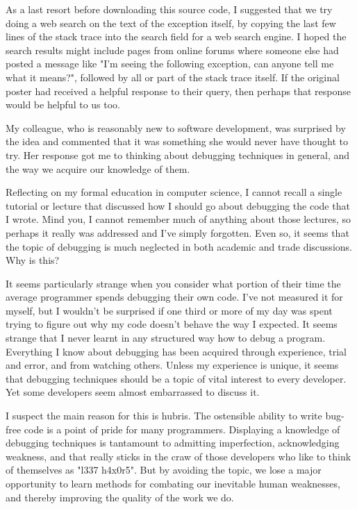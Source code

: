 \documentclass{article}
\begin{document}
As a last resort before downloading this source code, I suggested that
we try doing a web search on the text of the exception itself, by
copying the last few lines of the stack trace into the search field for
a web search engine. I hoped the search results might include pages from
online forums where someone else had posted a message like "I'm seeing
the following exception, can anyone tell me what it means?", followed by
all or part of the stack trace itself. If the original poster had
received a helpful response to their query, then perhaps that response
would be helpful to us too.

My colleague, who is reasonably new to software development, was
surprised by the idea and commented that it was something she would
never have thought to try. Her response got me to thinking about
debugging techniques in general, and the way we acquire our knowledge of
them.

Reflecting on my formal education in computer science, I cannot recall a
single tutorial or lecture that discussed how I should go about
debugging the code that I wrote. Mind you, I cannot remember much of
anything about those lectures, so perhaps it really was addressed and
I've simply forgotten. Even so, it seems that the topic of debugging is
much neglected in both academic and trade discussions. Why is this?

It seems particularly strange when you consider what portion of their
time the average programmer spends debugging their own code. I've not
measured it for myself, but I wouldn't be surprised if one third or more
of my day was spent trying to figure out why my code doesn't behave the
way I expected. It seems strange that I never learnt in any structured
way how to debug a program. Everything I know about debugging has been
acquired through experience, trial and error, and from watching others.
Unless my experience is unique, it seems that debugging techniques
should be a topic of vital interest to every developer. Yet some
developers seem almost embarrassed to discuss it.

I suspect the main reason for this is hubris. The ostensible ability to
write bug-free code is a point of pride for many programmers. Displaying
a knowledge of debugging techniques is tantamount to admitting
imperfection, acknowledging weakness, and that really sticks in the craw
of those developers who like to think of themselves as "l337 h4x0r5".
But by avoiding the topic, we lose a major opportunity to learn methods
for combating our inevitable human weaknesses, and thereby improving the
quality of the work we do.
\end{document}
